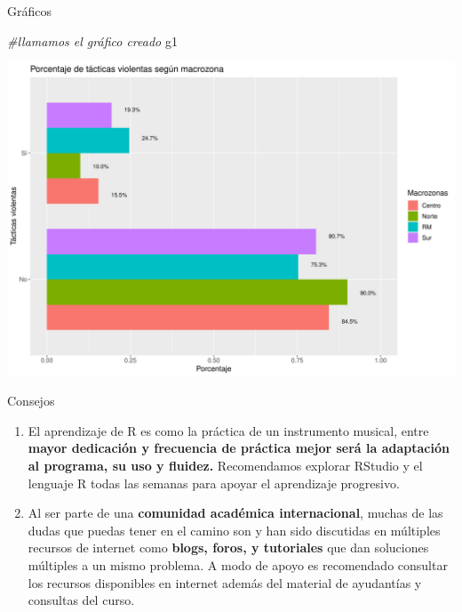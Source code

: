 \documentclass[
  8pt,
  ignorenonframetext,
]{beamer}
\newenvironment{Shaded}{\begin{snugshade}}{\end{snugshade}}
\newcommand{\CommentTok}[1]{\textcolor[rgb]{0.56,0.35,0.01}{\textit{#1}}}
\newcommand{\NormalTok}[1]{#1}
\begin{document}
\begin{frame}[fragile]{Gráficos}
\protect\hypertarget{gruxe1ficos-6}{}
\begin{Shaded}
\begin{Highlighting}[]
\CommentTok{\#llamamos el gráfico creado}
\NormalTok{g1}
\end{Highlighting}
\end{Shaded}

\begin{center}\includegraphics[width=0.9\linewidth]{ta_3_files/figure-beamer/unnamed-chunk-14-1} \end{center}
\end{frame}

\begin{frame}{Consejos}
\protect\hypertarget{consejos}{}
\begin{enumerate}
\item
  El aprendizaje de R es como la práctica de un instrumento musical,
  entre \textbf{mayor dedicación y frecuencia de práctica mejor será la
  adaptación al programa, su uso y fluidez.} Recomendamos explorar
  RStudio y el lenguaje R todas las semanas para apoyar el aprendizaje
  progresivo.
\item
  Al ser parte de una \textbf{comunidad académica internacional}, muchas
  de las dudas que puedas tener en el camino son y han sido discutidas
  en múltiples recursos de internet como \textbf{blogs, foros, y
  tutoriales} que dan soluciones múltiples a un mismo problema. A modo
  de apoyo es recomendado consultar los recursos disponibles en internet
  además del material de ayudantías y consultas del curso.
\end{enumerate}
\end{frame}
\end{document}
